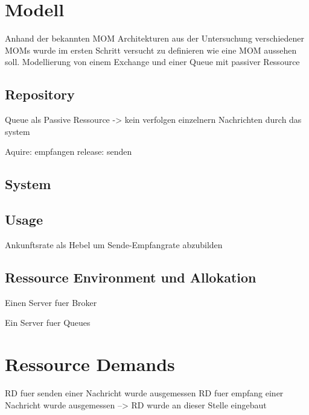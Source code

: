 \section{Modell}
Anhand der bekannten MOM Architekturen aus der Untersuchung verschiedener MOMs wurde im ersten Schritt versucht zu definieren wie eine MOM aussehen soll. Modellierung von einem Exchange und einer Queue mit passiver Ressource
\subsection{Repository}
Queue als Passive Ressource -> kein verfolgen einzelnern Nachrichten durch das system

Aquire: empfangen
release: senden

\subsection{System}

\subsection{Usage}
Ankunftsrate als Hebel um Sende-Empfangrate abzubilden
\subsection{Ressource Environment und Allokation}
Einen Server fuer Broker

Ein Server fuer Queues

\section{Ressource Demands}

RD fuer senden einer Nachricht wurde ausgemessen
RD fuer empfang einer Nachricht wurde ausgemessen
--> RD wurde an dieser Stelle eingebaut








